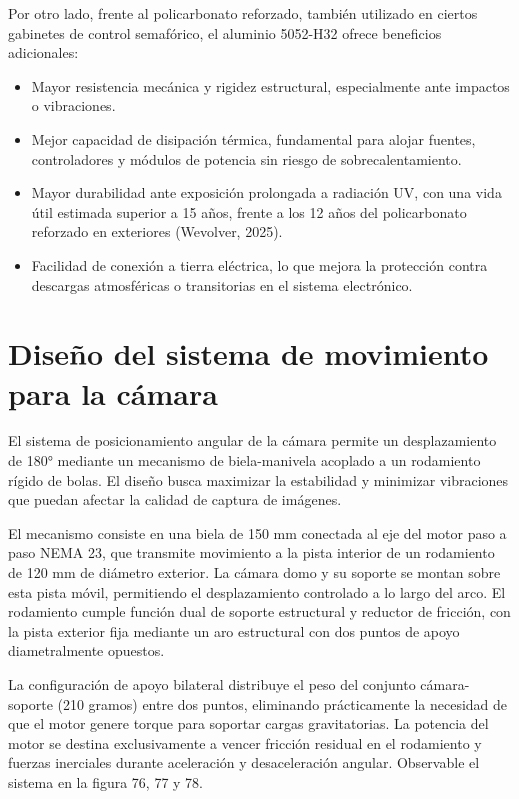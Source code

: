 \documentclass[12pt,a4paper,oneside]{report}
\begin{document}
Por otro lado, frente al policarbonato reforzado, también utilizado en ciertos gabinetes de control semafórico, el aluminio 5052-H32 ofrece beneficios adicionales:

\begin{itemize}
\item
  Mayor resistencia mecánica y rigidez estructural, especialmente ante impactos o vibraciones.
\item
  Mejor capacidad de disipación térmica, fundamental para alojar fuentes, controladores y módulos de potencia sin riesgo de sobrecalentamiento.
\item
  Mayor durabilidad ante exposición prolongada a radiación UV, con una vida útil estimada superior a 15 años, frente a los 12 años del policarbonato reforzado en exteriores (Wevolver, 2025).
\item
  Facilidad de conexión a tierra eléctrica, lo que mejora la protección contra descargas atmosféricas o transitorias en el sistema electrónico.
\end{itemize}

\section{Diseño del sistema de movimiento para la cámara}\label{diseuxf1o-del-sistema-de-movimiento-para-la-cuxe1mara}

El sistema de posicionamiento angular de la cámara permite un desplazamiento de 180° mediante un mecanismo de biela-manivela acoplado a un rodamiento rígido de bolas. El diseño busca maximizar la estabilidad y minimizar vibraciones que puedan afectar la calidad de captura de imágenes.

El mecanismo consiste en una biela de 150 mm conectada al eje del motor paso a paso NEMA 23, que transmite movimiento a la pista interior de un rodamiento de 120 mm de diámetro exterior. La cámara domo y su soporte se montan sobre esta pista móvil, permitiendo el desplazamiento controlado a lo largo del arco. El rodamiento cumple función dual de soporte estructural y reductor de fricción, con la pista exterior fija mediante un aro estructural con dos puntos de apoyo diametralmente opuestos.

La configuración de apoyo bilateral distribuye el peso del conjunto cámara-soporte (210 gramos) entre dos puntos, eliminando prácticamente la necesidad de que el motor genere torque para soportar cargas gravitatorias. La potencia del motor se destina exclusivamente a vencer fricción residual en el rodamiento y fuerzas inerciales durante aceleración y desaceleración angular. Observable el sistema en la figura 76, 77 y 78.
\end{document}
